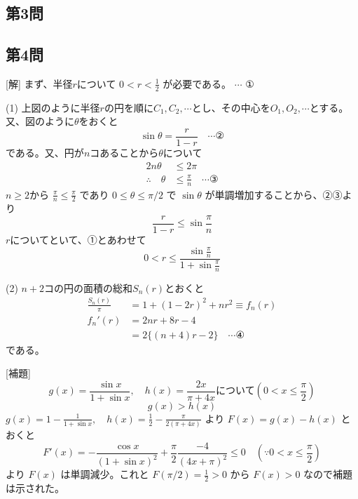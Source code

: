\documentclass[../main.tex]{subfiles}
\begin{document}
\subsection*{第3問}

\subsection*{第4問}
[解] まず、半径$r$について $0 < r < \frac{1}{2}$ が必要である。 $\cdots$ ①

\begin{center}
\end{center}

(1) 上図のように半径$r$の円を順に$C_1, C_2, \cdots$とし、その中心を$O_1, O_2, \cdots$とする。又、図のように$\theta$をおくと
$$ \sin \theta = \frac{r}{1-r} \quad \cdots \text{②} $$
である。又、円が$n$コあることから$\theta$について
\begin{align*}
  2n\theta &\le 2\pi \\
  \therefore \quad \theta &\le \frac{\pi}{n} \quad \cdots \text{③}
\end{align*}
$n \ge 2$から $\frac{\pi}{n} \le \frac{\pi}{2}$ であり $0 \le \theta \le \pi/2$ で $\sin \theta$ が単調増加することから、②③より
$$ \frac{r}{1-r} \le \sin \frac{\pi}{n} $$
$r$についてといて、①とあわせて
$$ 0 < r \le \frac{\sin \frac{\pi}{n}}{1+\sin \frac{\pi}{n}} $$

(2) $n+2$コの円の面積の総和$S_n(r)$とおくと
\begin{align*}
  \frac{S_n(r)}{\pi} &= 1 + (1-2r)^2 + nr^2 \equiv f_n(r) \\
  f_n'(r) &= 2nr + 8r - 4 \\
  &= 2 \{(n+4)r - 2\} \quad \cdots \text{④}
\end{align*}
である。

[補題]
$$ g(x) = \frac{\sin x}{1+\sin x}, \quad h(x) = \frac{2x}{\pi+4x} \text{について} \left(0 < x \le \frac{\pi}{2}\right) $$
$$ g(x) > h(x) $$
$g(x) = 1 - \frac{1}{1+\sin x}, \quad h(x) = \frac{1}{2} - \frac{\pi}{2(\pi+4x)}$ より
$F(x) = g(x) - h(x)$ とおくと
$$ F'(x) = - \frac{\cos x}{(1+\sin x)^2} + \frac{\pi}{2} \frac{-4}{(4x+\pi)^2} \le 0 \quad \left(\because 0 < x \le \frac{\pi}{2}\right) $$
より $F(x)$ は単調減少。これと $F(\pi/2) = \frac{1}{2} > 0$ から $F(x) > 0$ なので補題は示された。
\end{document}
